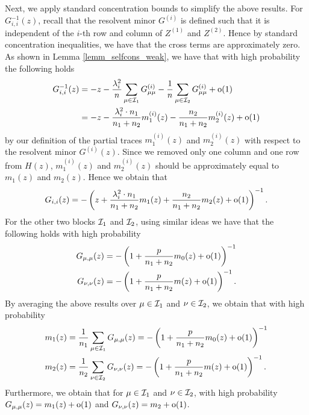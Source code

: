 Next, we apply standard concentration bounds to simplify the above results.
For $G^{-1}_{i, i}(z)$, recall that the resolvent minor $G^{(i)}$ is defined such that it is independent of the $i$-th row and column of $Z^{(1)}$ and $Z^{(2)}$.
Hence by standard concentration inequalities, we have that the cross terms are approximately zero.
As shown in Lemma \ref{lemm_selfcons_weak}, we have that with high probability the following holds
\begin{align*}
	G_{i,i}^{-1}(z) &= -z - \frac{\lambda_i^2}{n} \sum_{\mu \in \mathcal I_1}  G^{\left( i \right)}_{\mu\mu} - \frac{1}{n} \sum_{\mu\in \mathcal I_2} G^{\left( i \right)}_{\mu\mu} +\oo(1) \\
	&= - z - \frac{\lambda_i^2 \cdot n_1}{n_1 + n_2} m_1^{(i)}(z)-  \frac{n_2}{n_1 + n_2} m_2^{(i)}(z)+\oo(1)
\end{align*}
by our definition of the partial traces $m_1^{(i)}(z)$ and $m_2^{(i)}(z)$ with respect to the resolvent minor $G^{(i)}(z)$.
Since we removed only one column and one row from $H(z)$, $m_1^{(i)}(z)$ and $m_2^{(i)}(z)$ should be approximately equal to $m_1(z)$ and $m_2(z)$.
Hence we obtain that
\begin{align}\label{1self_Gii}
	G_{i,i}(z)  = -\left(z + \frac{\lambda_i^2 \cdot n_1}{n_1 + n_2} m_1(z) +  \frac{n_2}{n_1 + n_2} m_2(z) + \oo(1)\right)^{-1}.
\end{align}
For the other two blocks $\cal I_1$ and $\cal I_2$, using similar ideas we have that the following holds with high probability
\begin{align*}
	G_{\mu,\mu}(z) &= -\left(1+\frac{p}{n_1 + n_2} m_0(z) + \oo(1)\right)^{-1} \\
	G_{\nu,\nu}(z) &= -\left(1+\frac{p}{n_1 + n_2} m(z) + \oo(1)\right)^{-1}.
\end{align*}
By averaging the above results over $\mu \in \cal I_1$ and $\nu \in \cal I_2$, we obtain that with high probability
\begin{align*}
	m_1(z) &= \frac{1}{n_1}\sum_{\mu \in \cal I_1}G_{\mu,\mu}(z) = -\left(1+\frac{p}{n_1 + n_2} m_0(z) + \oo(1)\right)^{-1} \\
	m_2(z) &= \frac{1}{n_2}\sum_{\nu \in \cal I_2}G_{\nu,\nu}(z) = -\left(1+\frac{p}{n_1 + n_2} m(z) + \oo(1)\right)^{-1}.
\end{align*}
Furthermore, we obtain that for $\mu \in \cal I_1$ and $\nu\in \cal I_2$, with high probability
$G_{\mu,\mu}(z) = m_1(z) +\oo(1)$ and $G_{\nu, \nu}(z) = m_2+\oo(1)$.
